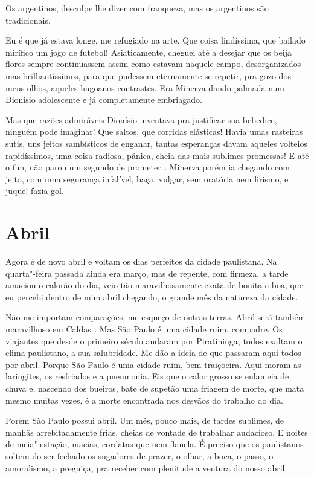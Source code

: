 Os argentinos, desculpe lhe dizer com franqueza, mas os argentinos são
tradicionais.

Eu é que já estava longe, me refugiado na arte. Que coisa lindíssima,
que bailado mirífico um jogo de futebol! Asiaticamente, cheguei até a
desejar que os beija flores sempre continuassem assim como estavam
naquele campo, desorganizados mas brilhantíssimos, para que pudessem
eternamente se repetir, pra gozo dos meus olhos, aqueles hugoanos
contrastes. Era Minerva dando palmada num Dionísio adolescente e já
completamente embriagado.

Mas que razões admiráveis Dionísio inventava pra justificar sua
bebedice, ninguém pode imaginar! Que saltos, que corridas elásticas!
Havia umas rasteiras sutis, uns jeitos sambísticos de enganar, tantas
esperanças davam aqueles volteios rapidíssimos, uma coisa radiosa,
pânica, cheia das mais sublimes promessas! E até o fim, não parou um
segundo de prometer\ldots{} Minerva porém ia chegando com jeito, com uma
segurança infalível, baça, vulgar, sem oratória nem lirismo, e juque!
fazia gol.

\chapter{Abril}

Agora é de novo abril e voltam os dias perfeitos da cidade paulistana.
Na quarta"-feira passada ainda era março, mas de repente, com firmeza, a
tarde amaciou o calorão do dia, veio tão maravilhosamente exata de
bonita e boa, que eu percebi dentro de mim abril chegando, o grande mês
da natureza da cidade.

Não me importam comparações, me esqueço de outras terras. Abril será
também maravilhoso em Caldas\ldots{} Mas São Paulo é uma cidade ruim,
compadre. Os viajantes que desde o primeiro século andaram por
Piratininga, todos exaltam o clima paulistano, a sua salubridade. Me dão
a ideia de que passaram aqui todos por abril. Porque São Paulo é uma
cidade ruim, bem traiçoeira. Aqui moram as laringites, os resfriados e a
pneumonia. Eis que o calor grosso se enlameia de chuva e, nascendo dos
bueiros, bate de supetão uma friagem de morte, que mata mesmo muitas
vezes, é a morte encontrada nos desvãos do trabalho do dia.

Porém São Paulo possui abril. Um mês, pouco mais, de tardes sublimes, de
manhãs arrebitadamente frias, cheias de vontade de trabalhar audacioso.
E noites de meia"-estação, macias, cordatas que nem flanela. É preciso
que os paulistanos soltem do ser fechado os sugadores de prazer, o
olhar, a boca, o passo, o amoralismo, a preguiça, pra receber com
plenitude a ventura do nosso abril.

